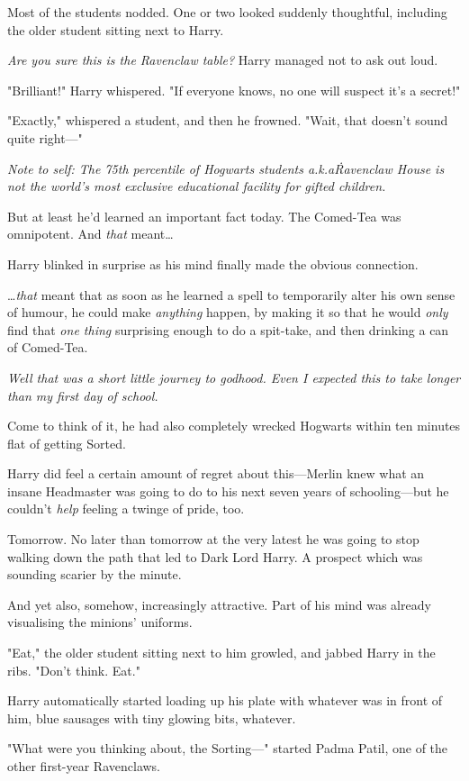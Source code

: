 Most of the students nodded. One or two looked suddenly thoughtful, including
the older student sitting next to Harry.

\emph{Are you sure this is the Ravenclaw table?} Harry managed not to ask out
loud.

"Brilliant!" Harry whispered. "If everyone knows, no one will suspect it's a
secret!"

"Exactly," whispered a student, and then he frowned. "Wait, that doesn't sound
quite right---"

\emph{Note to self: The 75th percentile of Hogwarts students a.k.a\. Ravenclaw
House is not the world's most exclusive educational facility for gifted children.}

But at least he'd learned an important fact today. The Comed-Tea was
omnipotent. And \emph{that} meant{\ldots}

Harry blinked in surprise as his mind finally made the obvious connection.

{\ldots}\emph{that} meant that as soon as he learned a spell to temporarily
alter his own sense of humour, he could make \emph{anything} happen, by making
it so that he would \emph{only} find that \emph{one thing} surprising enough to
do a spit-take, and then drinking a can of Comed-Tea.

\emph{Well that was a short little journey to godhood. Even I expected this to
take longer than my first day of school.}

Come to think of it, he had also completely wrecked Hogwarts within ten minutes
flat of getting Sorted.

Harry did feel a certain amount of regret about this---Merlin knew what an
insane Headmaster was going to do to his next seven years of schooling---but he
couldn't \emph{help} feeling a twinge of pride, too.

Tomorrow. No later than tomorrow at the very latest he was going to stop
walking down the path that led to Dark Lord Harry. A prospect which was
sounding scarier by the minute.

And yet also, somehow, increasingly attractive. Part of his mind was already
visualising the minions' uniforms.

"Eat," the older student sitting next to him growled, and jabbed Harry in the
ribs. "Don't think. Eat."

Harry automatically started loading up his plate with whatever was in front of
him, blue sausages with tiny glowing bits, whatever.

"What were you thinking about, the Sorting---" started Padma Patil, one of
the other first-year Ravenclaws.

